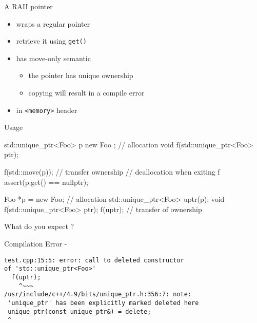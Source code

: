 \begin{frame}[fragile]
  \begin{block}{A RAII pointer}
    \begin{itemize}
    \item wraps a regular pointer
    \item retrieve it using \texttt{get()}
    \item has move-only semantic
      \begin{itemize}
      \item the pointer has unique ownership
      \item copying will result in a compile error
      \end{itemize}
    \item in \texttt{<memory>} header
    \end{itemize}
  \end{block}
  \pause
  \begin{exampleblock}{Usage}
    \begin{cppcode*}{}
      std::unique_ptr<Foo> p{ new Foo{} }; // allocation
      void f(std::unique_ptr<Foo> ptr);

      f(std::move(p)); // transfer ownership
      // deallocation when exiting f
      assert(p.get() == nullptr);
    \end{cppcode*}
  \end{exampleblock}
\end{frame}

\begin{frame}[fragile]
  \begin{exampleblock}{}
    \begin{cppcode*}{}
      Foo *p = new Foo{};  // allocation
      std::unique_ptr<Foo> uptr(p);
      void f(std::unique_ptr<Foo> ptr);
      f(uptr); // transfer of ownership
    \end{cppcode*}
    What do you expect ?
  \end{exampleblock}
  \pause
  \begin{alertblock}{Compilation Error - }
    \begin{verbatim}
test.cpp:15:5: error: call to deleted constructor
of 'std::unique_ptr<Foo>'
  f(uptr);
    ^~~~
/usr/include/c++/4.9/bits/unique_ptr.h:356:7: note:
 'unique_ptr' has been explicitly marked deleted here
 unique_ptr(const unique_ptr&) = delete;
 ^
    \end{verbatim}
  \end{alertblock}
\end{frame}

